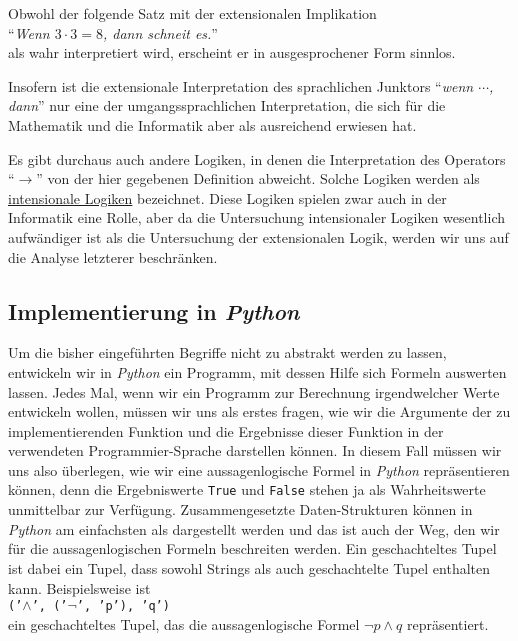 Obwohl der folgende Satz mit der extensionalen Implikation 
\\[0.2cm]
\hspace*{1.3cm}
``\textsl{Wenn $3 \cdot 3 = 8$, dann schneit es.}''
\\[0.2cm]
als wahr interpretiert wird, erscheint er in ausgesprochener Form sinnlos.

Insofern ist die extensionale Interpretation des sprachlichen Junktors
``\textsl{wenn $\cdots$, dann}'' nur eine  der umgangssprachlichen Interpretation, die sich für die
Mathematik und die Informatik aber als ausreichend erwiesen hat.

Es gibt durchaus auch andere Logiken, in denen die Interpretation des Operators ``$\rightarrow$'' von der
hier gegebenen Definition abweicht.  Solche Logiken werden als
\href{https://en.wikipedia.org/wiki/Intensional_logic}{intensionale Logiken} bezeichnet.  Diese Logiken spielen
zwar auch in der Informatik eine Rolle, aber da die Untersuchung intensionaler Logiken wesentlich
aufwändiger ist als die Untersuchung der extensionalen Logik, werden wir uns auf die Analyse letzterer beschränken.

\subsection{Implementierung in \textsl{Python}} 
Um die bisher eingeführten Begriffe nicht zu abstrakt werden zu lassen,
entwickeln wir in \textsl{Python} ein Programm, mit dessen Hilfe sich Formeln
auswerten lassen.  
Jedes Mal, wenn wir ein Programm zur Berechnung irgendwelcher Werte entwickeln wollen,
müssen wir uns als erstes fragen, wie wir die Argumente der zu implementierenden Funktion und die
Ergebnisse dieser Funktion in der verwendeten Programmier-Sprache darstellen können.
In diesem Fall müssen wir uns also überlegen, wie wir eine
aussagenlogische Formel in \textsl{Python} repräsentieren können, denn die Ergebniswerte
\texttt{True} und \texttt{False} stehen ja als Wahrheitswerte unmittelbar zur Verfügung.
Zusammengesetzte Daten-Strukturen können in \textsl{Python} am einfachsten als
 dargestellt werden und das ist auch der Weg, den wir für
die aussagenlogischen Formeln beschreiten werden.  Ein geschachteltes Tupel ist dabei ein Tupel, dass
sowohl Strings als auch geschachtelte Tupel enthalten kann.  Beispiels\-weise ist
\\[0.2cm]
\hspace*{1.3cm}
\texttt{('$\wedge$', ('$\neg$', 'p'), 'q')}
\\[0.2cm]
ein geschachteltes Tupel, das die aussagenlogische Formel $\neg p \wedge q$ repräsentiert.

